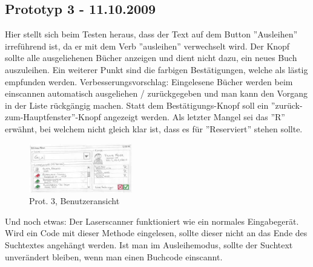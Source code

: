 \documentclass[10pt, a4paper]{scrartcl}
\begin{document}
\subsection{Prototyp 3 - 11.10.2009}
Hier stellt sich beim Testen heraus, dass der Text auf dem Button ''Ausleihen'' irreführend ist, da er mit dem Verb ''ausleihen'' verwechselt wird. Der Knopf sollte alle ausgeliehenen Bücher anzeigen und dient nicht dazu, ein neues Buch auszuleihen. Ein weiterer Punkt sind die farbigen Bestätigungen, welche als lästig empfunden werden. Verbesserungsvorschlag: Eingelesene Bücher werden beim einscannen automatisch ausgeliehen / zurückgegeben und man kann den Vorgang in der Liste rückgängig machen. Statt dem Bestätigungs-Knopf soll ein ''zurück-zum-Hauptfenster''-Knopf angezeigt werden. Als letzter Mangel sei das ''R'' erwähnt, bei welchem nicht gleich klar ist, dass es für ''Reserviert'' stehen sollte. 

\begin{figure}
  \begin{center}
   \includegraphics[width=45mm]{prototyp3Thumbnail} \\
   Prot. 3, Benutzeransicht
  \end{center}
\end{figure}

Und noch etwas: Der Laserscanner funktioniert wie ein normales Eingabegerät. Wird ein Code mit dieser Methode eingelesen, sollte dieser nicht an das Ende des Suchtextes angehängt werden. Ist man im Ausleihemodus, sollte der Suchtext unverändert bleiben, wenn man einen Buchcode einscannt.
\end{document}
